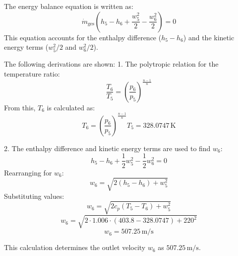 The energy balance equation is written as:  
\[
\dot{m}_{\text{ges}} \left( h_5 - h_6 + \frac{w_5^2}{2} - \frac{w_6^2}{2} \right) = 0
\]  
This equation accounts for the enthalpy difference (\(h_5 - h_6\)) and the kinetic energy terms (\(w_5^2/2\) and \(w_6^2/2\)).  

The following derivations are shown:  
1. The polytropic relation for the temperature ratio:  
\[
\frac{T_6}{T_5} = \left( \frac{p_6}{p_5} \right)^{\frac{n-1}{n}}
\]  
From this, \(T_6\) is calculated as:  
\[
T_6 = \left( \frac{p_6}{p_5} \right)^{\frac{n-1}{n}} T_5 = 328.0747 \, \text{K}
\]  

2. The enthalpy difference and kinetic energy terms are used to find \(w_6\):  
\[
h_5 - h_6 + \frac{1}{2} w_5^2 - \frac{1}{2} w_6^2 = 0
\]  
Rearranging for \(w_6\):  
\[
w_6 = \sqrt{2 \left( h_5 - h_6 \right) + w_5^2}
\]  
Substituting values:  
\[
w_6 = \sqrt{2 c_p \left( T_5 - T_6 \right) + w_5^2}
\]  
\[
w_6 = \sqrt{2 \cdot 1.006 \cdot (403.8 - 328.0747) + 220^2}
\]  
\[
w_6 = 507.25 \, \text{m/s}
\]  

This calculation determines the outlet velocity \(w_6\) as \(507.25 \, \text{m/s}\).